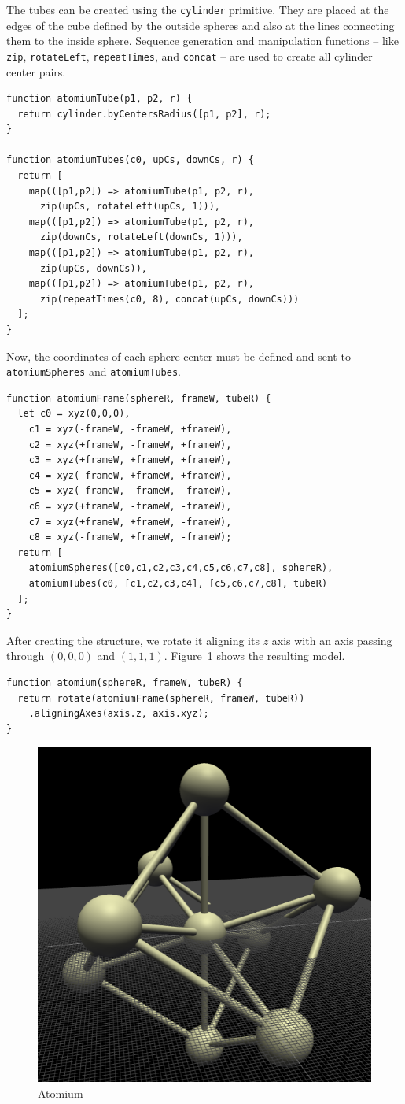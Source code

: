 The tubes can be created using the {\tt cylinder} primitive.
They are placed at the edges of the cube defined by the outside spheres and also at the lines connecting them to the inside sphere.
Sequence generation and manipulation functions -- like {\tt zip}, {\tt rotateLeft}, {\tt repeatTimes}, and {\tt concat} -- are used to create all cylinder center pairs.

\begin{verbatim}
function atomiumTube(p1, p2, r) {
  return cylinder.byCentersRadius([p1, p2], r);
}

function atomiumTubes(c0, upCs, downCs, r) {
  return [
    map(([p1,p2]) => atomiumTube(p1, p2, r),
      zip(upCs, rotateLeft(upCs, 1))),
    map(([p1,p2]) => atomiumTube(p1, p2, r),
      zip(downCs, rotateLeft(downCs, 1))),
    map(([p1,p2]) => atomiumTube(p1, p2, r),
      zip(upCs, downCs)),
    map(([p1,p2]) => atomiumTube(p1, p2, r),
      zip(repeatTimes(c0, 8), concat(upCs, downCs)))
  ];
}
\end{verbatim}

Now, the coordinates of each sphere center must be defined and sent to {\tt atomiumSpheres} and {\tt atomiumTubes}.

\begin{verbatim}
function atomiumFrame(sphereR, frameW, tubeR) {
  let c0 = xyz(0,0,0),
    c1 = xyz(-frameW, -frameW, +frameW),
    c2 = xyz(+frameW, -frameW, +frameW),
    c3 = xyz(+frameW, +frameW, +frameW),
    c4 = xyz(-frameW, +frameW, +frameW),
    c5 = xyz(-frameW, -frameW, -frameW),
    c6 = xyz(+frameW, -frameW, -frameW),
    c7 = xyz(+frameW, +frameW, -frameW),
    c8 = xyz(-frameW, +frameW, -frameW);
  return [
    atomiumSpheres([c0,c1,c2,c3,c4,c5,c6,c7,c8], sphereR),
    atomiumTubes(c0, [c1,c2,c3,c4], [c5,c6,c7,c8], tubeR)
  ];
}
\end{verbatim}

After creating the structure, we rotate it aligning its $z$ axis with an axis passing through $(0,0,0)$ and $(1,1,1)$.
Figure~\ref{fig:ex:atomium} shows the resulting model.

\begin{verbatim}
function atomium(sphereR, frameW, tubeR) {
  return rotate(atomiumFrame(sphereR, frameW, tubeR))
    .aligningAxes(axis.z, axis.xyz);
}
\end{verbatim}

\begin{figure}
  \centering
  \includegraphics[width=0.5\linewidth]{./images/detail_examples/atomium_2_crop}
  \caption{Atomium}
  \label{fig:ex:atomium}
\end{figure}


